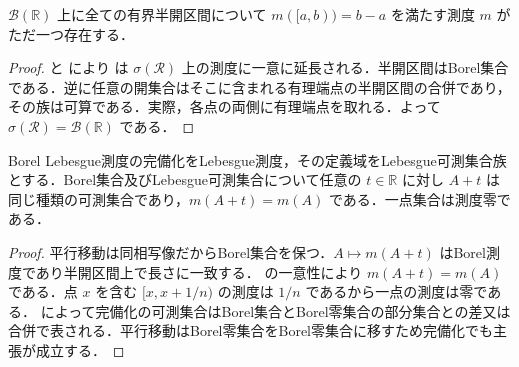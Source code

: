 \begin{prop}
$\mathcal B(\mathbb R)$ 上に全ての有界半開区間について $m([a,b))=b-a$ を満たす測度 $m$ がただ一つ存在する．
\end{prop}
\begin{proof}
 と  により  は $\sigma(\mathcal R)$ 上の測度に一意に延長される．半開区間はBorel集合である．逆に任意の開集合はそこに含まれる有理端点の半開区間の合併であり，その族は可算である．実際，各点の両側に有理端点を取れる．よって $\sigma(\mathcal R)=\mathcal B(\mathbb R)$ である．
\end{proof}
\begin{prop}[Lebesgue測度の完備化と平行移動不変性]
Borel Lebesgue測度の完備化をLebesgue測度，その定義域をLebesgue可測集合族とする．Borel集合及びLebesgue可測集合について任意の $t\in\mathbb R$ に対し $A+t$ は同じ種類の可測集合であり，$m(A+t)=m(A)$ である．一点集合は測度零である．
\end{prop}
\begin{proof}
平行移動は同相写像だからBorel集合を保つ．$A\mapsto m(A+t)$ はBorel測度であり半開区間上で長さに一致する． の一意性により $m(A+t)=m(A)$ である．点 $x$ を含む $[x,x+1/n)$ の測度は $1/n$ であるから一点の測度は零である． によって完備化の可測集合はBorel集合とBorel零集合の部分集合との差又は合併で表される．平行移動はBorel零集合をBorel零集合に移すため完備化でも主張が成立する．
\end{proof}
